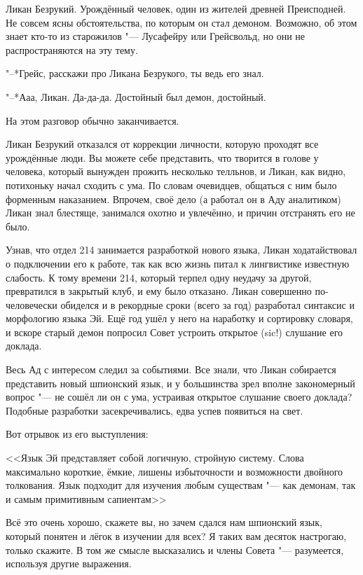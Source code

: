 Ликан Безрукий.
Урождённый человек, один из жителей древней Преисподней.
Не совсем ясны обстоятельства, по которым он стал демоном.
Возможно, об этом знает кто-то из старожилов "--- Лусафейру или Грейсвольд, но они не распространяются на эту тему.

"--*Грейс, расскажи про Ликана Безрукого, ты ведь его знал.

"--*Ааа, Ликан.
Да-да-да.
Достойный был демон, достойный.

На этом разговор обычно заканчивается.

Ликан Безрукий отказался от коррекции личности, которую проходят все урождённые люди.
Вы можете себе представить, что творится в голове у человека, который вынужден прожить несколько телльнов, и Ликан, как видно, потихоньку начал сходить с ума.
По словам очевидцев, общаться с ним было форменным наказанием.
Впрочем, своё дело (а работал он в Аду аналитиком) Ликан знал блестяще, занимался охотно и увлечённо, и причин отстранять его не было.

Узнав, что отдел 214 занимается разработкой нового языка, Ликан ходатайствовал о подключении его к работе, так как всю жизнь питал к лингвистике известную слабость.
К тому времени 214, который терпел одну неудачу за другой, превратился в закрытый клуб, и ему было отказано.
Ликан совершенно по-человечески обиделся и в рекордные сроки (всего за год) разработал синтаксис и морфологию языка Эй.
Ещё год ушёл у него на наработку и сортировку словаря, и вскоре старый демон попросил Совет устроить открытое (sic!) слушание его доклада.

Весь Ад с интересом следил за событиями.
Все знали, что Ликан собирается представить новый шпионский язык, и у большинства зрел вполне закономерный вопрос "--- не сошёл ли он с ума, устраивая открытое слушание своего доклада?
Подобные разработки засекречивались, едва успев появиться на свет.

Вот отрывок из его выступления:

<<\ldotst Язык Эй представляет собой логичную, стройную систему.
Слова максимально короткие, ёмкие, лишены избыточности и возможности двойного толкования.
Язык подходит для изучения любым существам "--- как демонам, так и самым примитивным сапиентам\ldotst>>

Всё это очень хорошо, скажете вы, но зачем сдался нам шпионский язык, который понятен и лёгок в изучении для всех?
Я таких вам десяток настрогаю, только скажите.
В том же смысле высказались и члены Совета "--- разумеется, используя другие выражения.

